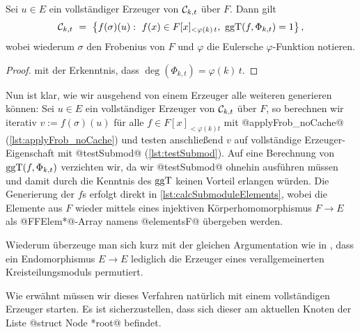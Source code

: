 \begin{lemma}
  Sei $u\in E$ ein vollständiger Erzeuger von $\mathcal{C}_{k,t}$ über $F$. 
  Dann gilt
  \[ \C_{k,t} \speq= \big\{ f(\sigma)(u):\ f(x) \in F[x]_{<\varphi(k)\,t},\ 
    \ggT(f,\Phi_{k,t}) = 1 \big\} \,,\]
  wobei wiederum $\sigma$ den Frobenius von $F$ und 
  $\varphi$ die Eulersche $\varphi$-Funktion notieren.
\end{lemma}
\begin{proof}
   mit der Erkenntnis, dass
  $\deg(\Phi_{k,t}) = \varphi(k)\,t$.
\end{proof}

Nun ist klar, wie wir ausgehend von einem Erzeuger alle weiteren generieren
können: Sei $u \in E$ ein vollständiger Erzeuger von $\mathcal{C}_{k,t}$ über $F$, so 
berechnen wir iterativ $v := f(\sigma)(u)$ für alle $f \in F[x]_{<\varphi(k)t}$
mit @applyFrob_noCache@ (\autoref{lst:applyFrob_noCache}) 
und testen anschließend $v$ auf vollständige Erzeuger-Eigenschaft mit 
@testSubmod@ (\autoref{lst:testSubmod}). Auf eine Berechnung von 
$\operatorname{ggT}(f,\Phi_{k,t})$ verzichten wir, da wir @testSubmod@ ohnehin ausführen
müssen und damit durch die Kenntnis des $\operatorname{ggT}$ keinen Vorteil erlangen würden.
Die Generierung der $f$s erfolgt direkt in \autoref{lst:calcSubmoduleElements},
wobei die Elemente aus $F$ wieder mittels eines injektiven Körperhomomorphismus 
$F\to E$ als @FFElem*@-Array namens @elementsF@ übergeben werden.

\begin{bemerkung}
  Wiederum überzeuge man sich kurz mit der gleichen Argumentation wie in 
  \thref{lemma:einbettung_egal}, dass ein Endomorphismus $E\to E$ lediglich die
  Erzeuger eines verallgemeinerten Kreisteilungsmoduls permutiert.
\end{bemerkung}

Wie erwähnt müssen wir dieses Verfahren natürlich mit einem vollständigen
Erzeuger starten. Es ist sicherzustellen, dass sich dieser am aktuellen Knoten 
der Liste @struct Node *root@ befindet.

